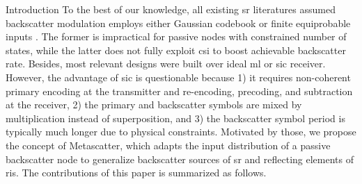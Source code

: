 \documentclass[journal]{IEEEtran}
\begin{document}
\begin{section}{Introduction}
	To the best of our knowledge, all existing \gls{sr} literatures assumed backscatter modulation employs either Gaussian codebook \cite{Guo2019b,Ding2020,Long2020a,Zhou2019a,Wu2021a,Xu2021a,Yang2021a} or finite equiprobable inputs \cite{Yang2018,Han2021,Zhang2022,Xu2020b,Hua2022,Hu2021a}.
	The former is impractical for passive nodes with constrained number of states, while the latter does not fully exploit \gls{csi} to boost achievable backscatter rate.
	Besides, most relevant designs \cite{Guo2019b,Ding2020,Long2020a,Zhou2019a,Wu2021a,Xu2021a,Yang2021a,Yang2018,Han2021,Zhang2022,Xu2020b,Hua2022} were built over ideal \gls{ml} or \gls{sic} receiver.
	However, the advantage of \gls{sic} is questionable because 1) it requires non-coherent primary encoding at the transmitter and re-encoding, precoding, and subtraction at the receiver, 2) the primary and backscatter symbols are mixed by multiplication instead of superposition, and 3) the backscatter symbol period is typically much longer due to physical constraints.
	Motivated by those, we propose the concept of Metascatter, which adapts the input distribution of a passive backscatter node to generalize backscatter sources of \gls{sr} and reflecting elements of \gls{ris}.
	The contributions of this paper is summarized as follows.


\end{section}
\end{document}
